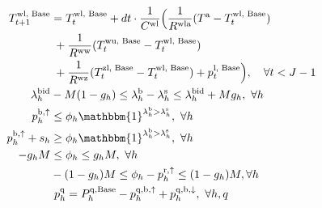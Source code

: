 \documentclass[conference]{IEEEtran}
\begin{document}
\begin{subequations}
\begin{align}
        T^{\text{wl, Base}}_{t+1} & = T^{\text{wl, Base}}_{t} + dt \cdot \frac{1}{C^{\text{wl}}}\Bigl( \frac{1}{R^{\text{wla}}} (T^{\text{a}} - T^{\text{wl, Base}}_{t}) \notag                                           \\ & \mspace{5mu} + \frac{1}{R^{\text{ww}}} (T^{\text{wu, Base}}_{t} - T^{\text{wl, Base}}_{t}) \notag \\ & \mspace{5mu}  + \frac{1}{R^{\text{wz}}} (T^{\text{zl, Base}}_{t} - T^{\text{wl, Base}}_{t}) + p^{\text{l, Base}}_{t} \Bigr), \quad \forall{t} < J-1 \label{P2:StateSpaceBase4} \\
        \lambda_{h}^{\rm{bid}} & - M  (1 - g_{h}) \leq \lambda_{h}^{\rm{b}} - \lambda_{h}^{\rm{s}} \leq \lambda_{h}^{\rm{bid}} + M  g_{h}, \ \forall{h}                               \label{con_bid:subeq1} \\
        p^{\rm{b}, \uparrow}_{h} & \leq \phi_{h}  \mathbbm{1}^{\lambda^{\rm{b}}_{h} > \lambda^{\rm{s}}_{h}}, \  \forall{h}                          \label{con_bid:subeq3}                                                \\
        p^{\rm{b}, \uparrow}_{h} + s_{h} & \geq \phi_{h}  \mathbbm{1}^{\lambda^{\rm{b}}_{h} > \lambda^{\rm{s}}_{h}},  \ \forall{h}            \label{con_bid:subeq4}                                               \\
         -g_{h}  M & \leq \phi_{h} \leq g_{h}  M,\  \forall{h}                                   \label{con_bid:subeq5}                                                                                                            \\
         & -(1 - g_{h})  M \leq \phi_{h} - p^{\rm{r},\uparrow}_{h} \leq (1 - g_{h}) M,  \forall{h}\                                                                                    \label{con_bid:subeq7} \\
           & \ p_{h}^{\rm{q}} = P^{\rm{q},\rm{Base}}_{h} - p^{\rm{q},\rm{b}, \uparrow}_{h} + p^{\rm{q},\rm{b}, \downarrow}_{h}, \                                                                                                  \forall{h, q}                                                                             \label{power:6q}                                                                                                                                                                                                                           \\

\end{align}
\end{subequations}
\end{document}
